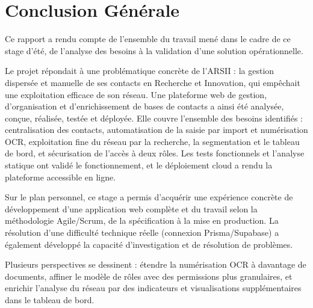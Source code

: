 
\chapter*{Conclusion Générale}

Ce rapport a rendu compte de l'ensemble du travail mené dans le cadre de ce stage d'été, de l'analyse des besoins à la validation d'une solution opérationnelle.

Le projet répondait à une problématique concrète de l'ARSII : la gestion dispersée et manuelle de ses contacts en Recherche et Innovation, qui empêchait une exploitation efficace de son réseau. Une plateforme web de gestion, d'organisation et d'enrichissement de bases de contacts a ainsi été analysée, conçue, réalisée, testée et déployée. Elle couvre l'ensemble des besoins identifiés : centralisation des contacts, automatisation de la saisie par import et numérisation OCR, exploitation fine du réseau par la recherche, la segmentation et le tableau de bord, et sécurisation de l'accès à deux rôles. Les tests fonctionnels et l'analyse statique ont validé le fonctionnement, et le déploiement cloud a rendu la plateforme accessible en ligne.

Sur le plan personnel, ce stage a permis d'acquérir une expérience concrète de développement d'une application web complète et du travail selon la méthodologie Agile/Scrum, de la spécification à la mise en production. La résolution d'une difficulté technique réelle (connexion Prisma/Supabase) a également développé la capacité d'investigation et de résolution de problèmes.

Plusieurs perspectives se dessinent : étendre la numérisation OCR à davantage de documents, affiner le modèle de rôles avec des permissions plus granulaires, et enrichir l'analyse du réseau par des indicateurs et visualisations supplémentaires dans le tableau de bord.
